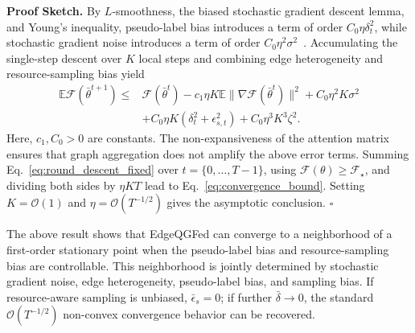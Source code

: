 ﻿\documentclass[10pt, conference, letterpaper]{ IEEEtran}
\begin{document}
\textbf{Proof Sketch.}
By $L$-smoothness, the biased stochastic gradient descent lemma, and Young's inequality, pseudo-label bias introduces a term of order $C_0\eta\delta_t^2$, while stochastic gradient noise introduces a term of order $C_0\eta^2\sigma^2$~\cite{bottou2018optimization}. Accumulating the single-step descent over $K$ local steps and combining edge heterogeneity and resource-sampling bias yield
\begin{align}
    \mathbb{E}\mathcal{F}(\bar{\theta}^{t+1})
    \le&
    \mathcal{F}(\bar{\theta}^{t})
    -c_1\eta K
    \mathbb{E}\|\nabla\mathcal{F}(\bar{\theta}^t)\|^2
    +C_0\eta^2K\sigma^2 \nonumber\\
    &+C_0\eta K(\delta_t^2+\epsilon_{s,t}^2)+C_0\eta^3K^3\zeta^2 .
    \label{eq:round_descent_fixed}
\end{align}
Here, $c_1, C_0>0$ are constants. The non-expansiveness of the attention matrix ensures that graph aggregation does not amplify the above error terms. Summing Eq.~\eqref{eq:round_descent_fixed} over $t = \{0, \ldots, T-1\}$, using $\mathcal{F}(\theta)\ge\mathcal{F}_\star$, and dividing both sides by $\eta KT$ lead to Eq.~\eqref{eq:convergence_bound}. Setting $K=\mathcal{O}(1)$ and $\eta=\mathcal{O}(T^{-1/2})$ gives the asymptotic conclusion. \hfill$\square$

The above result shows that EdgeQGFed can converge to a neighborhood of a first-order stationary point when the pseudo-label bias and resource-sampling bias are controllable. This neighborhood is jointly determined by stochastic gradient noise, edge heterogeneity, pseudo-label bias, and sampling bias. If resource-aware sampling is unbiased, $\bar{\epsilon}_s=0$; if further $\bar{\delta}\to0$, the standard $\mathcal{O}(T^{-1/2})$ non-convex convergence behavior can be recovered.

\begin{table}[t]
\centering
\caption{Datasets and Default Partition Settings}
\label{tab:datasets}
\end{table}
\end{document}
